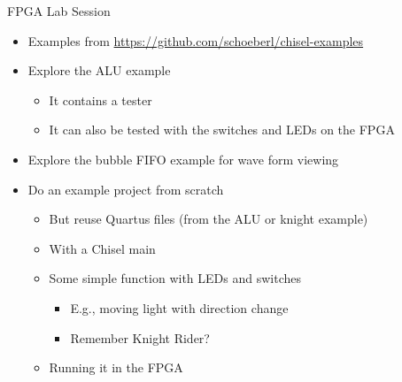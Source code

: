 \begin{frame}[fragile]{FPGA Lab Session}
\begin{itemize}
\item Examples from \url{https://github.com/schoeberl/chisel-examples}
\item Explore the ALU example
\begin{itemize}
\item It contains a tester
\item It can also be tested with the switches and LEDs on the FPGA
\end{itemize}
\item Explore the bubble FIFO example for wave form viewing
\item Do an example project from scratch
\begin{itemize}
\item But reuse Quartus files (from the ALU or knight example)
\item With a Chisel main
\item Some simple function with LEDs and switches
\begin{itemize}
\item E.g., moving light with direction change
\item Remember Knight Rider?
\end{itemize}
\item Running it in the FPGA
\end{itemize}
\end{itemize}
\end{frame}

